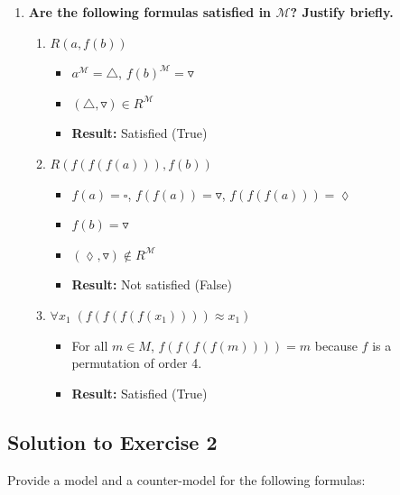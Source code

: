 \documentclass[11pt]{article}
\begin{document}
\begin{enumerate}
        \item \textbf{Are the following formulas satisfied in $\mathcal{M}$? Justify briefly.}
        \begin{enumerate}
            \item $R(a, f(b))$
            \begin{itemize}
                \item $a^\mathcal{M} = \triangle$, $f(b)^\mathcal{M} = \triangledown$
                \item $(\triangle, \triangledown) \in R^\mathcal{M}$
                \item \textbf{Result:} Satisfied (True)
            \end{itemize}
            \item $R(f(f(f(a))), f(b))$
            \begin{itemize}
                \item $f(a) = \square$, $f(f(a)) = \triangledown$, $f(f(f(a))) = \lozenge$
                \item $f(b) = \triangledown$
                \item $(\lozenge, \triangledown) \notin R^\mathcal{M}$
                \item \textbf{Result:} Not satisfied (False)
            \end{itemize}
            \item $\forall x_1\; (f(f(f(f(x_1)))) \approx x_1)$
            \begin{itemize}
                \item For all $m \in M$, $f(f(f(f(m)))) = m$ because $f$ is a permutation of order 4.
                \item \textbf{Result:} Satisfied (True)
            \end{itemize}
        \end{enumerate}
    \end{enumerate}

    \subsection{Solution to Exercise 2}\label{subsec:solution-to-exercise-2}

    Provide a model and a counter-model for the following formulas:
\end{document}
